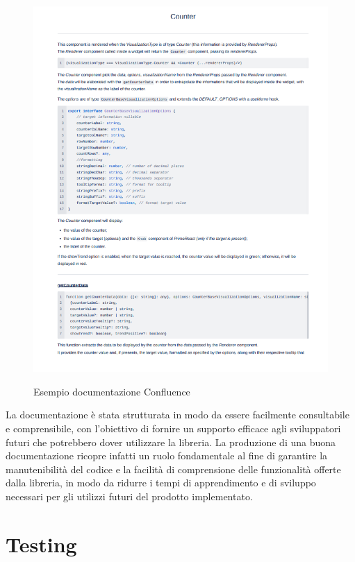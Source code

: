\begin{figure}[H]
    \centering
    \includegraphics[alt={Esempio documentazione Confluence}, width=1 \textwidth]{img/ex_confluence.png}
    \caption{Esempio documentazione Confluence}
    \label{fig:datasoil}
\end{figure}

La documentazione è stata strutturata in modo da essere facilmente consultabile e comprensibile, con l'obiettivo di
fornire un supporto efficace agli sviluppatori futuri che potrebbero dover utilizzare la libreria. \newline
La produzione di una buona documentazione ricopre infatti un ruolo fondamentale al fine di garantire la manutenibilità
del codice e la facilità di comprensione delle funzionalità offerte dalla libreria, in modo da ridurre i tempi di
apprendimento e di sviluppo necessari per gli utilizzi futuri del prodotto implementato.

\section{Testing}

